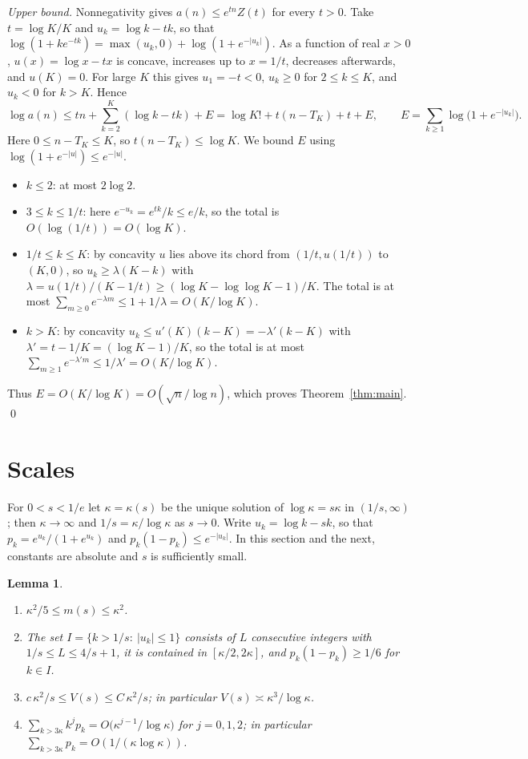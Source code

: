 \documentclass[11pt,a4paper]{article}
\newtheorem{lemma}[theorem]{Lemma}
\theoremstyle{remark}
\begin{document}
\emph{Upper bound.} Nonnegativity gives $a(n)\le e^{tn}Z(t)$ for every $t>0$. Take $t=\log K/K$ and $u_k=\log k-tk$, so that $\log(1+ke^{-tk})=\max(u_k,0)+\log(1+e^{-|u_k|})$. As a function of real $x>0$, $u(x)=\log x-tx$ is concave, increases up to $x=1/t$, decreases afterwards, and $u(K)=0$. For large $K$ this gives $u_1=-t<0$, $u_k\ge0$ for $2\le k\le K$, and $u_k<0$ for $k>K$. Hence
\[
 \log a(n)\le tn+\sum_{k=2}^K(\log k-tk)+E=\log K!+t(n-T_K)+t+E,\qquad E=\sum_{k\ge1}\log\bigl(1+e^{-|u_k|}\bigr).
\]
Here $0\le n-T_K\le K$, so $t(n-T_K)\le\log K$. We bound $E$ using $\log(1+e^{-|u|})\le e^{-|u|}$.
\begin{itemize}
\item $k\le2$: at most $2\log2$.
\item $3\le k\le1/t$: here $e^{-u_k}=e^{tk}/k\le e/k$, so the total is $O(\log(1/t))=O(\log K)$.
\item $1/t\le k\le K$: by concavity $u$ lies above its chord from $(1/t,u(1/t))$ to $(K,0)$, so $u_k\ge\lambda(K-k)$ with $\lambda=u(1/t)/(K-1/t)\ge(\log K-\log\log K-1)/K$. The total is at most $\sum_{m\ge0}e^{-\lambda m}\le1+1/\lambda=O(K/\log K)$.
\item $k>K$: by concavity $u_k\le u'(K)(k-K)=-\lambda'(k-K)$ with $\lambda'=t-1/K=(\log K-1)/K$, so the total is at most $\sum_{m\ge1}e^{-\lambda'm}\le1/\lambda'=O(K/\log K)$.
\end{itemize}
Thus $E=O(K/\log K)=O(\sqrt n/\log n)$, which proves Theorem~\ref{thm:main}. \qed

\section{Scales}

For $0<s<1/e$ let $\kappa=\kappa(s)$ be the unique solution of $\log\kappa=s\kappa$ in $(1/s,\infty)$; then $\kappa\to\infty$ and $1/s=\kappa/\log\kappa$ as $s\to0$. Write $u_k=\log k-sk$, so that $p_k=e^{u_k}/(1+e^{u_k})$ and $p_k(1-p_k)\le e^{-|u_k|}$. In this section and the next, constants are absolute and $s$ is sufficiently small.

\begin{lemma}\label{lem:scales}
\begin{enumerate}
\item[(i)] $\kappa^2/5\le m(s)\le\kappa^2$.
\item[(ii)] The set $I=\{k>1/s:\ |u_k|\le1\}$ consists of $L$ consecutive integers with $1/s\le L\le4/s+1$, it is contained in $[\kappa/2,2\kappa]$, and $p_k(1-p_k)\ge1/6$ for $k\in I$.
\item[(iii)] $c\,\kappa^2/s\le V(s)\le C\,\kappa^2/s$; in particular $V(s)\asymp\kappa^3/\log\kappa$.
\item[(iv)] $\sum_{k>3\kappa}k^jp_k=O\bigl(\kappa^{j-1}/\log\kappa\bigr)$ for $j=0,1,2$; in particular $\sum_{k>3\kappa}p_k=O(1/(\kappa\log\kappa))$.
\end{enumerate}
\end{lemma}
\end{document}
